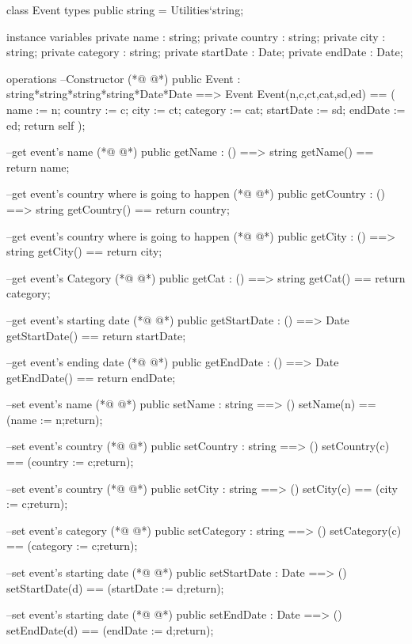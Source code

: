 \begin{vdmpp}[breaklines=true]
class Event
types
 public string = Utilities`string;

instance variables
 private name : string;
 private country : string;
 private city : string;
 private category : string;
 private startDate : Date;
 private endDate : Date;
 
operations
 --Constructor
(*@
\label{Event:15}
@*)
 public Event : string*string*string*string*Date*Date ==> Event
  Event(n,c,ct,cat,sd,ed) ==
  (
   name := n;
   country := c;
   city := ct;
   category := cat;
   startDate := sd;
   endDate := ed;
   return self
  );
  
 --get event's name
(*@
\label{getName:28}
@*)
 public getName : () ==> string
  getName() == return name;
  
 --get event's country where is going to happen
(*@
\label{getCountry:32}
@*)
 public getCountry : () ==> string
  getCountry() == return country;
  
 --get event's country where is going to happen
(*@
\label{getCity:36}
@*)
 public getCity : () ==> string
  getCity() == return city;
  
 --get event's Category
(*@
\label{getCat:40}
@*)
 public getCat : () ==> string
  getCat() == return category;
  
 --get event's starting date
(*@
\label{getStartDate:44}
@*)
 public getStartDate : () ==> Date
  getStartDate() == return startDate;
  
 --get event's ending date
(*@
\label{getEndDate:48}
@*)
 public getEndDate : () ==> Date
  getEndDate() == return endDate;
 
 --set event's name
(*@
\label{setName:52}
@*)
 public setName : string ==> ()
  setName(n) == (name := n;return);
  
 --set event's country
(*@
\label{setCountry:56}
@*)
 public setCountry : string ==> ()
  setCountry(c) == (country := c;return);
 
 --set event's country
(*@
\label{setCity:60}
@*)
 public setCity : string ==> ()
  setCity(c) == (city := c;return);
 
 --set event's category
(*@
\label{setCategory:64}
@*)
 public setCategory : string ==> ()
  setCategory(c) == (category := c;return);
  
 --set event's starting date
(*@
\label{setStartDate:68}
@*)
 public setStartDate : Date ==> ()
  setStartDate(d) == (startDate := d;return);
  
 --set event's starting date
(*@
\label{setEndDate:72}
@*)
 public setEndDate : Date ==> ()
  setEndDate(d) == (endDate := d;return);
  

\end{vdmpp}
